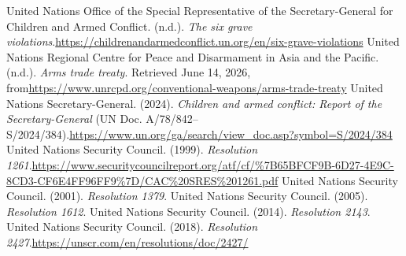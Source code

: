 \begin{referencelist}
   United Nations Office of the Special Representative of the Secretary-General for Children and Armed Conflict. (n.d.). \emph{The six grave violations}.\url{https://childrenandarmedconflict.un.org/en/six-grave-violations}
   United Nations Regional Centre for Peace and Disarmament in Asia and the Pacific. (n.d.). \emph{Arms trade treaty}. Retrieved June 14, 2026, from\url{https://www.unrcpd.org/conventional-weapons/arms-trade-treaty}
   United Nations Secretary-General. (2024). \emph{Children and armed conflict: Report of the Secretary-General} (UN Doc. A/78/842–S/2024/384).\url{https://www.un.org/ga/search/view_doc.asp?symbol=S/2024/384}
   United Nations Security Council. (1999). \emph{Resolution 1261}.\url{https://www.securitycouncilreport.org/atf/cf/\%7B65BFCF9B-6D27-4E9C-8CD3-CF6E4FF96FF9\%7D/CAC\%20SRES\%201261.pdf}
   United Nations Security Council. (2001). \emph{Resolution 1379}.
   United Nations Security Council. (2005). \emph{Resolution 1612}.
   United Nations Security Council. (2014). \emph{Resolution 2143}.
   United Nations Security Council. (2018). \emph{Resolution 2427}.\url{https://unscr.com/en/resolutions/doc/2427/}
\end{referencelist}
